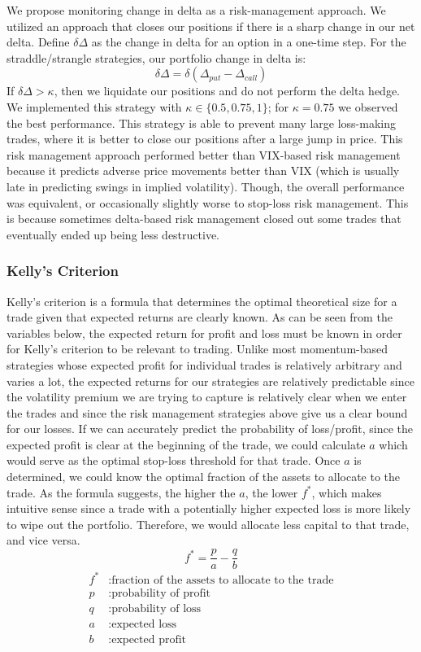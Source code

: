 \documentclass[10pt]{article}
\theoremstyle{definition}
\begin{document}
We propose monitoring change in delta as a risk-management approach. We utilized an approach that closes our positions if there is a sharp change in our net delta. Define $\delta{\Delta}$ as the change in delta for an option in a one-time step. For the straddle/strangle strategies, our portfolio change in delta is: $$\delta{\Delta} = \delta(\Delta_{put} - \Delta_{call})$$
If $\delta{\Delta} > \kappa$, then we liquidate our positions and do not perform the delta hedge. We implemented this strategy with $\kappa \in \{0.5, 0.75, 1\}$; for $\kappa=0.75$ we observed the best performance. This strategy is able to prevent many large loss-making trades, where it is better to close our positions after a large jump in price. This risk management approach performed better than VIX-based risk management because it predicts adverse price movements better than VIX (which is usually late in predicting swings in implied volatility). Though, the overall performance was equivalent, or occasionally slightly worse to stop-loss risk management. This is because sometimes delta-based risk management closed out some trades that eventually ended up being less destructive. 

\subsubsection{Kelly's Criterion}
Kelly's criterion is a formula that determines the optimal theoretical size for a trade given that expected returns are clearly known. As can be seen from the variables below, the expected return for profit and loss must be known in order for Kelly's criterion to be relevant to trading. Unlike most momentum-based strategies whose expected profit for individual trades is relatively arbitrary and varies a lot, the expected returns for our strategies are relatively predictable since the volatility premium we are trying to capture is relatively clear when we enter the trades and since the risk management strategies above give us a clear bound for our losses. If we can accurately predict the probability of loss/profit, since the expected profit is clear at the beginning of the trade, we could calculate $a$ which would serve as the optimal stop-loss threshold for that trade. Once $a$ is determined, we could know the optimal fraction of the assets to allocate to the trade. As the formula suggests, the higher the $a$, the lower $f^*$, which makes intuitive sense since a trade with a potentially higher expected loss is more likely to wipe out the portfolio. Therefore, we would allocate less capital to that trade, and vice versa.
$$f^* = \frac{p}{a} - \frac{q}{b}$$
\begin{align*}
    f^*&: \text{fraction of the assets to allocate to the trade}\\
p&: \text{probability of profit}\\
q&: \text{probability of loss}\\
a&: \text{expected loss}\\
b&: \text{expected profit}
\end{align*}
\end{document}
